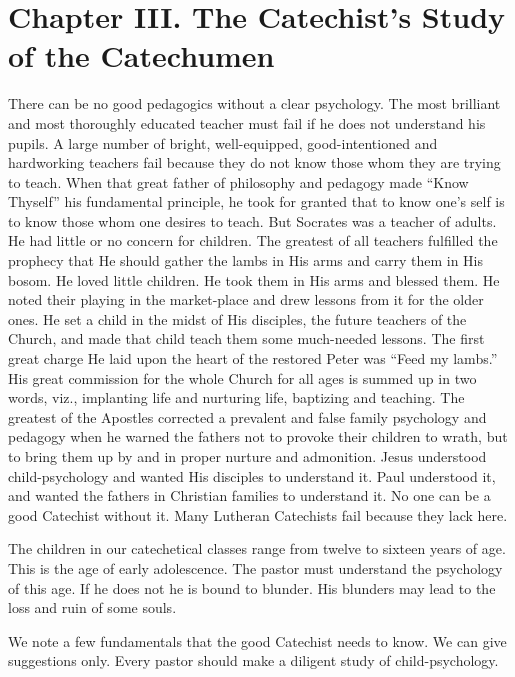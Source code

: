\chapter[Chapter III. Study of the Catechumen]{Chapter III. The Catechist’s Study of the Catechumen}

There can be no good pedagogics without a clear psychology. The most brilliant and most thoroughly educated teacher must fail if he does not understand his pupils. A large number of bright, well-equipped, good-intentioned and hardworking teachers fail because they do not know those whom they are trying to teach. When that great father of philosophy and pedagogy made “Know Thyself” his fundamental principle, he took for granted that to know one’s self is to know those whom one desires to teach. But Socrates was a teacher of adults. He had little or no concern for children. The greatest of all teachers fulfilled the prophecy that He should gather the lambs in His arms and carry them in His bosom. He loved little children. He took them in His arms and blessed them. He noted their playing in the market-place and drew lessons from it for the older ones. He set a child in the midst of His disciples, the future teachers of the Church, and made that child teach them some much-needed lessons. The first great charge He laid upon the heart of the restored Peter was “Feed my lambs.” His great commission for the whole Church for all
ages is summed up in two words, viz., implanting life and nurturing life, baptizing and teaching. The greatest of the Apostles corrected a prevalent and false family psychology and pedagogy when he warned the fathers not to provoke their children to wrath, but to bring them up by and in proper nurture and admonition. Jesus understood child-psychology and wanted His disciples to understand it. Paul understood it, and wanted the fathers in Christian families to understand it. No one can be a good Catechist without it. Many Lutheran Catechists fail because they lack here.

The children in our catechetical classes range from twelve to sixteen years of age. This is the age of early adolescence. The pastor must understand the psychology of this age. If he does not he is bound to blunder. His blunders may lead to the loss and ruin of some souls.

We note a few fundamentals that the good Catechist needs to know. We can give suggestions only. Every pastor should make a diligent study of child-psychology.

